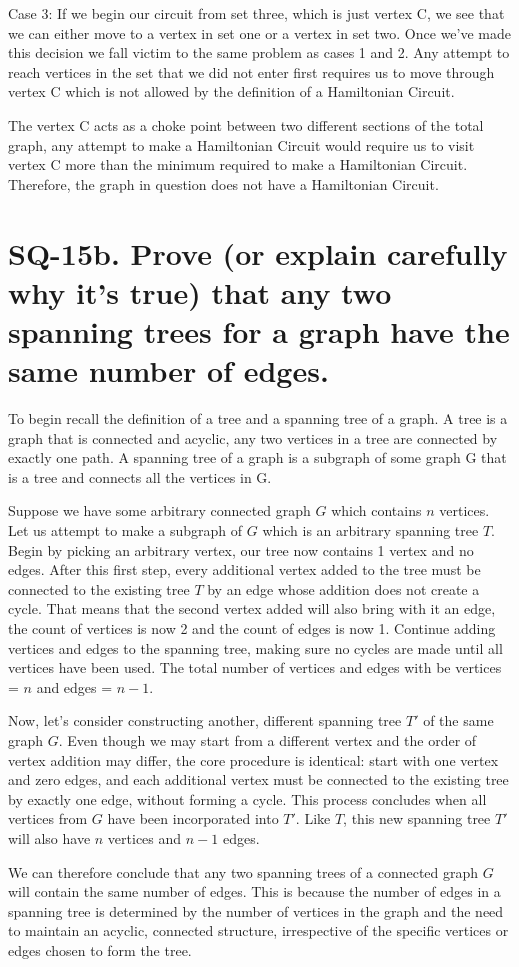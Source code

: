 \documentclass{article}
\begin{document}
Case 3: If we begin our circuit from set three, which is just vertex C, we see that we can either move to a vertex in set one or a vertex in set two. Once we've made this decision we fall victim to the same problem as cases 1 and 2. Any attempt to reach vertices in the set that we did not enter first requires us to move through vertex C which is not allowed by the definition of a Hamiltonian Circuit.

The vertex C acts as a choke point between two different sections of the total graph, any attempt to make a Hamiltonian Circuit would require us to visit vertex C more than the minimum required to make a Hamiltonian Circuit. Therefore, the graph in question does not have a Hamiltonian Circuit.

\newpage

\section*{SQ-15b. Prove (or explain carefully why it's true) that any two spanning trees for a graph have the same number of edges.}

\hspace*{\parindent}To begin recall the definition of a tree and a spanning tree of a graph. A tree is a graph that is connected and acyclic, any two vertices in a tree are connected by exactly one path. A spanning tree of a graph is a subgraph of some graph G that is a tree and connects all the vertices in G.

Suppose we have some arbitrary connected graph $G$ which contains $n$ vertices. Let us attempt to make a subgraph of $G$ which is an arbitrary spanning tree $T$. Begin by picking an arbitrary vertex, our tree now contains 1 vertex and no edges. After this first step, every additional vertex added to the tree must be connected to the existing tree $T$ by an edge whose addition does not create a cycle. That means that the second vertex added will also bring with it an edge, the count of vertices is now 2 and the count of edges is now 1. Continue adding vertices and edges to the spanning tree, making sure no cycles are made until all vertices have been used. The total number of vertices and edges with be vertices = $n$ and edges = $n-1$.

Now, let's consider constructing another, different spanning tree $T'$ of the same graph $G$. Even though we may start from a different vertex and the order of vertex addition may differ, the core procedure is identical: start with one vertex and zero edges, and each additional vertex must be connected to the existing tree by exactly one edge, without forming a cycle. This process concludes when all vertices from $G$ have been incorporated into $T'$. Like $T$, this new spanning tree $T'$ will also have $n$ vertices and $n-1$ edges.

We can therefore conclude that any two spanning trees of a connected graph $G$ will contain the same number of edges. This is because the number of edges in a spanning tree is determined by the number of vertices in the graph and the need to maintain an acyclic, connected structure, irrespective of the specific vertices or edges chosen to form the tree.
\end{document}

